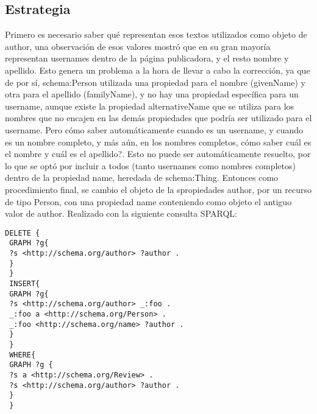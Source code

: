 \subsection*{Estrategia}
Primero es necesario saber qué representan esos textos utilizados como objeto de author, una observación de esos valores mostró que 
en su gran mayoría representan usernames dentro de la página publicadora, y el resto nombre y apellido.
Esto genera un problema a la hora de llevar a cabo la corrección, ya que de por sí, schema:Person utilizada una propiedad para el nombre (givenName) 
y otra para el apellido (familyName), y no hay una propiedad específica para un username, aunque existe la propiedad alternativeName que 
se utiliza para los nombres que no encajen en las demás propiedades que podría ser utilizado para el username.
Pero cómo saber automáticamente cuando es un username, y cuando es un nombre completo, y más aún, en los nombres completos, cómo saber cuál es el nombre y 
cuál es el apellido?.
Esto no puede ser automáticamente resuelto, por lo que se optó por incluir a todos (tanto usernames como nombres completos) dentro de la propiedad name, heredada de 
schema:Thing.
Entonces como procedimiento final, se cambio el objeto de la spropiedades author, por un recurso de tipo Person, con una propiedad name conteniendo 
como objeto el antiguo valor de author. Realizado con la siguiente consulta SPARQL:\\
\begin{lstlisting}[frame=single]
 DELETE { 
 GRAPH ?g{ 
 ?s <http://schema.org/author> ?author .
 } 
 } 
 INSERT{ 
 GRAPH ?g{ 
 ?s <http://schema.org/author> _:foo .
 _:foo a <http://schema.org/Person> .
 _:foo <http://schema.org/name> ?author .
 }
 }
 WHERE{
 GRAPH ?g {
 ?s a <http://schema.org/Review> .
 ?s <http://schema.org/author> ?author .
 }
 }
\end{lstlisting}